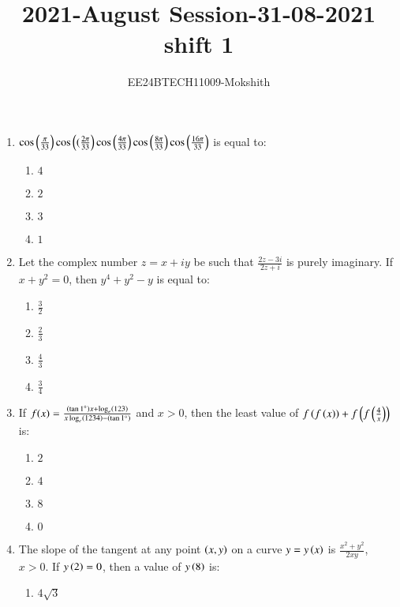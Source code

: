 \documentclass[journal]{IEEEtran}
\begin{document}

\title{2021-August Session-31-08-2021 shift 1}
\author{EE24BTECH11009-Mokshith}
{\let\newpage\relax\maketitle}
\renewcommand{\thefigure}{\theenumi}
\renewcommand{\thetable}{\theenumi}
\setlength{\intextsep}{10pt} %
\renewcommand{\thetable}{\theenumi}

\begin{enumerate}[start=16]
\item $\cos\left(\frac{\pi}{33}\right) \cos\left((\frac{2\pi}{33}\right) \cos\left(\frac{4\pi}{33}\right) \cos\left(\frac{8\pi}{33}\right) \cos\left(\frac{16\pi}{33}\right)$
is equal to:
\begin{enumerate}
    \item $4$
    \item $2$
    \item $3$
    \item $1$
\end{enumerate}
\item Let the complex number $z = x + iy$ be such that 
$\frac{2z - 3i}{2z + i}$ is purely imaginary. If $x + y^2 = 0$, then $y^4 + y^2 - y$ is equal to:
\begin{enumerate}
    \item $\frac{3}{2}$
    \item $\frac{2}{3}$
    \item $\frac{4}{3}$
    \item $\frac{3}{4}$
\end{enumerate}
\item If $f(x) = \frac{\left(\tan 1^\circ\right) x + \log_e\left(123\right)}{x \log_e\left(1234\right)-\left(\tan 1^\circ\right)}$ and $x > 0$, then the least value of 
$f\left(f\left(x\right)\right) + f\left(f\left(\frac{4}{x}\right)\right)$ is:
\begin{enumerate}
    \item $2$
    \item $4$
    \item $8$
    \item $0$
\end{enumerate}
\item The slope of the tangent at any point $\left(x, y\right)$ on a curve $y = y\left(x\right)$ is 
$\frac{x^2 + y^2}{2xy}$, $x > 0$. If $y\left(2\right) = 0$, then a value of $y\left(8\right)$ is:
\begin{enumerate}
    \item $4\sqrt{3}$

\end{enumerate}
\end{enumerate}
\end{document}

